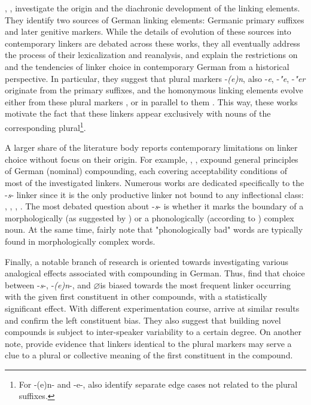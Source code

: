 \documentclass[10pt, a4paper]{article}
\newcommand{\zeroLinker}{\ensuremath{\boldsymbol{\varnothing}}}
\begin{document}
\citet{nuebling_szczepaniak_2013}, \citet{wegener_2003}, \citet{wegener_2005} investigate the origin and the diachronic development of the linking elements. They identify two sources of German linking elements: Germanic primary suffixes and later genitive markers. While the details of evolution of these sources into contemporary linkers are debated across these works, they all eventually address the process of their lexicalization and reanalysis, and explain the restrictions on and the tendencies of linker choice in contemporary German from a historical perspective. In particular, they suggest that plural markers -\textit{(e)n}, also -\textit{e}, -\textit{"e}, -\textit{"er} originate from the primary suffixes, and the homonymous linking elements evolve either from these plural markers \citep{nuebling_szczepaniak_2013}, or in parallel to them \citep{wegener_2003}. This way, these works motivate the fact that these linkers appear exclusively with nouns of the corresponding plural\footnote{For -(e)n- and -e-, \citet{nuebling_szczepaniak_2013} also identify separate edge cases not related to the plural suffixes.}. 

A larger share of the literature body reports contemporary limitations on linker choice without focus on their origin. For example, \citet[chapter 6.2]{eisenberg_2013}, \citet[chapter A.5]{ortner_mueller-bollhagen_1991}, \citet[chapter 8.1]{schaefer_2018} expound general principles of German (nominal) compounding, each covering acceptability conditions of most of the investigated linkers. Numerous works are dedicated specifically to the -\textit{s}- linker since it is the only productive linker not bound to any inflectional class: \citet{libben_etal_2009}, \citet{kopf_2017}, \citet{kuerschner_2005}, \citet{nuebling_szczepaniak_2008}. The most debated question about -\textit{s}- is whether it marks the boundary of a morphologically (as suggested by \citealp{kuerschner_2005}) or a phonologically (according to \citealp{nuebling_szczepaniak_2008}) complex noun. At the same time, \citet{fuhrhop_kuerschner_2015} fairly note that "phonologically bad" words are typically found in morphologically complex words. 

Finally, a notable branch of research is oriented towards investigating various analogical effects associated with compounding in German. Thus, \citet{krott_etal_2007} find that choice between -\textit{s}-, -\textit{(e)n}-, and \zeroLinker is biased towards the most frequent linker occurring with the given first constituent in other compounds, with a statistically significant effect. With different experimentation course, \citet{neef_borgwaldt_2012} arrive at similar results and confirm the left constituent bias. They also suggest that building novel compounds is subject to inter-speaker variability to a certain degree. On another note, \citet{schaefer_pankratz_2018} provide evidence that linkers identical to the plural markers may serve a clue to a plural or collective meaning of the first constituent in the compound.
\end{document}

